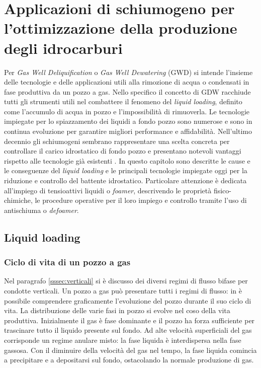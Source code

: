 \clearpage{\pagestyle{empty}\cleardoublepage}
\chapter{Applicazioni di schiumogeno per l'ottimizzazione della produzione degli idrocarburi}\thispagestyle{empty} 
Per \textit{Gas Well Deliquification} o \textit{Gas Well Dewatering} (GWD) si intende l'insieme delle tecnologie e delle applicazioni utili alla rimozione di acqua o condensati in fase produttiva da un pozzo a gas. Nello specifico il concetto di GDW racchiude tutti gli strumenti utili nel combattere il fenomeno del \textit{liquid loading}, definito come l'accumulo di acqua in pozzo e l'impossibilità di rimuoverla. Le tecnologie impiegate per lo spiazzamento dei liquidi a fondo pozzo sono numerose e sono in continua evoluzione per garantire migliori performance e affidabilità. Nell'ultimo decennio gli schiumogeni sembrano rappresentare una scelta concreta per controllare il carico idrostatico di fondo pozzo e presentano notevoli vantaggi rispetto alle tecnologie già esistenti \parencite{stanculescu2014gwd}. In questo capitolo sono descritte le cause e le conseguenze del \textit{liquid loading} e le principali tecnologie impiegate oggi per la riduzione e controllo del battente idrostatico. Particolare attenzione è dedicata all'impiego di tensioattivi liquidi o \textit{foamer}, descrivendo le proprietà fisico-chimiche, le procedure operative per il loro impiego e controllo tramite l'uso di antischiuma o  \textit{defoamer}.

\section{Liquid loading}
\subsection{Ciclo di vita di un pozzo a gas}
Nel paragrafo \ref{sssec:verticali} si è discusso dei diversi regimi di flusso bifase per condotte verticali. Un pozzo a gas può presentare tutti i regimi di flusso: in  è possibile comprendere graficamente l'evoluzione del pozzo durante il suo ciclo di vita. La distribuzione delle varie fasi in pozzo si evolve nel coso della vita produttiva. Inizialmente il gas è fase dominante e il pozzo ha forza sufficiente per trascinare tutto il liquido presente sul fondo. Ad alte velocità superficiali del gas corrisponde un regime anulare misto: la fase liquida è interdispersa nella fase gassosa. Con il diminuire della velocità del gas nel tempo, la fase liquida comincia a precipitare e a depositarsi sul fondo, ostacolando la normale produzione di gas.

